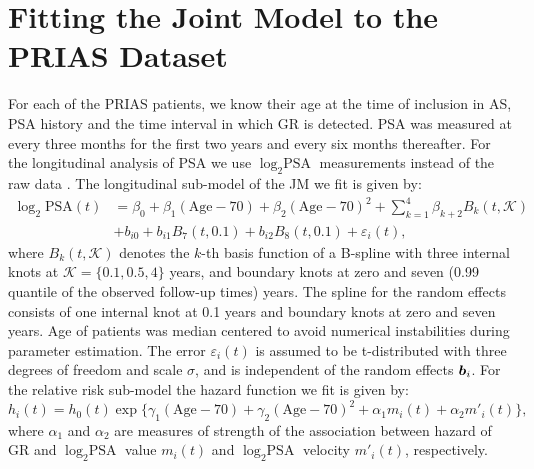 
\section{Fitting the Joint Model to the PRIAS Dataset}
\label{sec : param_estimates_jm_fit_prias}
For each of the PRIAS patients, we know their age at the time of inclusion in AS, PSA history and the time interval in which GR is detected. PSA was measured at every three months for the first two years and every six months thereafter. For the longitudinal analysis of PSA we use $\log_2 \mbox{PSA}$ measurements instead of the raw data \citep{nieboer2015nonlinear}. The longitudinal sub-model of the JM we fit is given by:
\begin{equation}
\label{eq : long_model_prias_web}
\begin{aligned}
\log_2 \mbox{PSA}(t) &= \beta_0 + \beta_1 (\mbox{Age}-70) + \beta_2 (\mbox{Age}-70)^2 + \sum_{k=1}^4 \beta_{k+2} B_k(t,\mathcal{K})\\ 
&+  b_{i0} + b_{i1} B_7(t, 0.1) + b_{i2} B_8(t, 0.1) +
\varepsilon_i(t),
\end{aligned}
\end{equation}
where $B_k(t, \mathcal{K})$ denotes the $k$-th basis function of a B-spline with three internal knots at $\mathcal{K} =\{0.1, 0.5, 4\}$ years, and boundary knots at zero and seven (0.99 quantile of the observed follow-up times) years. The spline for the random effects consists of one internal knot at 0.1 years and boundary knots at zero and seven years. Age of patients was median centered to avoid numerical instabilities during parameter estimation. The error $\varepsilon_i(t)$ is assumed to be t-distributed with three degrees of freedom and scale $\sigma$, and is independent of the random effects $\boldsymbol{b}_i$. For the relative risk sub-model the hazard function we fit is given by:
\begin{equation}
\label{eq : hazard_prias_web}
h_i(t) = h_0(t) \exp\big\{\gamma_1 (\mbox{Age}-70)  + \gamma_2 (\mbox{Age}-70)^2 + \alpha_1 m_i(t) + \alpha_2 m'_i(t)\big\},
\end{equation}
where $\alpha_1$ and $\alpha_2$ are measures of strength of the association between hazard of GR and $\log_2 \mbox{PSA}$ value $m_i(t)$ and $\log_2 \mbox{PSA}$ velocity $m'_i(t)$, respectively.

